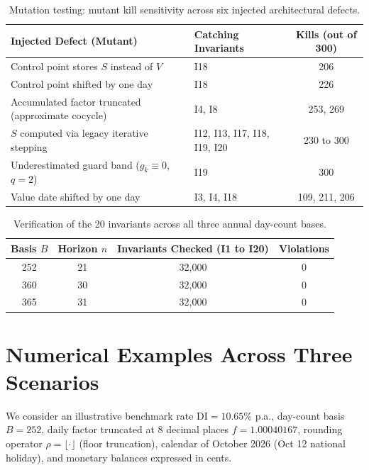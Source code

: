 \documentclass[11pt, a4paper]{article}
\theoremstyle{definition}
\theoremstyle{plain}
\theoremstyle{remark}
\begin{document}
\begin{table}[htbp]
\centering
\small
\begin{tabular}{@{}llc@{}}
\toprule
\textbf{Injected Defect (Mutant)} & \textbf{Catching Invariants} & \textbf{Kills (out of 300)} \\
\midrule
Control point stores $S$ instead of $V$           & I18                          & 206 \\
Control point shifted by one day                  & I18                          & 226 \\
Accumulated factor truncated (approximate cocycle) & I4, I8                       & 253, 269 \\
$S$ computed via legacy iterative stepping        & I12, I13, I17, I18, I19, I20 & 230 to 300 \\
Underestimated guard band ($g_k \equiv 0$, $q=2$)  & I19                          & 300 \\
Value date shifted by one day                     & I3, I4, I18                  & 109, 211, 206 \\
\bottomrule
\end{tabular}
\caption{Mutation testing: mutant kill sensitivity across six injected architectural defects.}
\label{tab:4}
\end{table}

\begin{table}[htbp]
\centering
\small
\begin{tabular}{@{}cccc@{}}
\toprule
\textbf{Basis $B$} & \textbf{Horizon $n$} & \textbf{Invariants Checked (I1 to I20)} & \textbf{Violations} \\
\midrule
252 & 21 & 32,000 & 0 \\
360 & 30 & 32,000 & 0 \\
365 & 31 & 32,000 & 0 \\
\bottomrule
\end{tabular}
\caption{Verification of the 20 invariants across all three annual day-count bases.}
\label{tab:5}
\end{table}

\section{Numerical Examples Across Three Scenarios}\label{sec:7}

We consider an illustrative benchmark rate $\text{DI} = 10.65\%$ p.a., day-count basis $B = 252$, daily factor truncated at 8 decimal places $f = 1.00040167$, rounding operator $\rho = \lfloor \cdot \rfloor$ (floor truncation), calendar of October 2026 (Oct 12 national holiday), and monetary balances expressed in cents.
\end{document}
